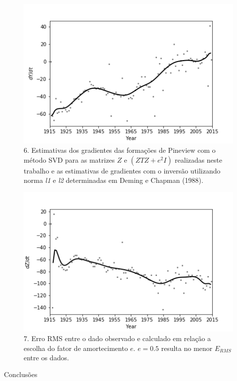 \documentclass[final,t]{beamer}
\begin{document}
\begin{columns}[t]
\begin{column}{.31\linewidth}
\begin{block}{}
	\begin{figure}
\centering
\includegraphics[width=0.7\linewidth]{spline100sv_y_spline}
\caption{6. Estimativas dos gradientes das formações de Pineview com o método SVD para as matrizes $Z$ e $(Z{T}Z+e^{2}I)$ realizadas neste trabalho e as estimativas de gradientes com o inversão utilizando norma \textit{l1} e \textit{l2} determinadas em Deming e Chapman (1988).}
\label{fig:g_Simposio_z1}
\end{figure}

\begin{figure}
\centering
\includegraphics[width=0.7\linewidth]{spline100sv_z_spline}
\caption{7. Erro RMS entre o dado observado e calculado em relação a escolha do fator de amortecimento $e$. $e=0.5$ resulta no menor $E_{RMS}$ entre os dados.}
\label{fig:eps_erro}
\end{figure}






\end{block}


% 
%

\begin{block}{Conclusões}


\end{block}
\end{column}
\end{columns}
\end{document}

